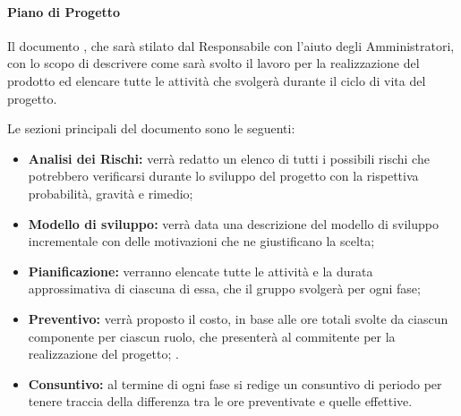 \paragraph{Piano di Progetto}\mbox{}
Il documento \PdP, che sarà stilato dal Responsabile con l'aiuto degli Amministratori, con lo scopo di descrivere come sarà svolto il lavoro per la realizzazione del prodotto ed elencare tutte le attività che \Gruppo{} svolgerà durante il ciclo di vita del progetto.


Le sezioni principali del documento sono le seguenti:
\begin{itemize}
	\item \textbf{Analisi dei Rischi:} verrà redatto un elenco di tutti i possibili rischi che potrebbero verificarsi durante lo sviluppo del progetto con la rispettiva probabilità, gravità e rimedio;
	\item \textbf{Modello di sviluppo:} verrà data una descrizione del modello di sviluppo incrementale con delle motivazioni che ne giustificano la scelta;
	\item \textbf{Pianificazione:} verranno elencate tutte le attività e la durata approssimativa di ciascuna di essa, che il gruppo svolgerà per ogni fase;
	\item \textbf{Preventivo:} verrà proposto il costo, in base alle ore totali svolte da ciascun componente per ciascun ruolo, che \Gruppo{} presenterà al commitente per la realizzazione del progetto; \NomeProgetto{}.
	\item \textbf{Consuntivo:} al termine di ogni fase si redige un consuntivo di periodo per tenere traccia della differenza tra le ore preventivate e quelle effettive.
\end{itemize}